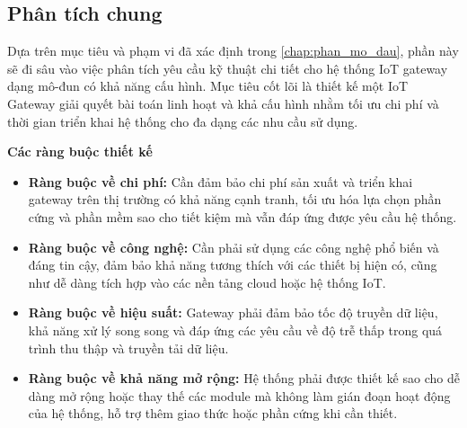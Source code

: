 \subsection{Phân tích chung}\label{sec:phan_tich_chung}
    Dựa trên mục tiêu và phạm vi đã xác định trong \autoref{chap:phan_mo_dau}, phần này sẽ đi sâu vào việc phân tích yêu cầu kỹ thuật chi tiết cho hệ thống IoT gateway dạng mô-đun có khả năng cấu hình. Mục tiêu cốt lõi là thiết kế một IoT Gateway giải quyết bài toán linh hoạt và khả cấu hình nhằm tối ưu chi phí và thời gian triển khai hệ thống cho đa dạng các nhu cầu sử dụng.

    \textbf{Các ràng buộc thiết kế}
        \begin{itemize}
            \item \textbf{Ràng buộc về chi phí:} Cần đảm bảo chi phí sản xuất và triển khai gateway trên thị trường có khả năng cạnh tranh, tối ưu hóa lựa chọn phần cứng và phần mềm sao cho tiết kiệm mà vẫn đáp ứng được yêu cầu hệ thống.
            \item \textbf{Ràng buộc về công nghệ:} Cần phải sử dụng các công nghệ phổ biến và đáng tin cậy, đảm bảo khả năng tương thích với các thiết bị hiện có, cũng như dễ dàng tích hợp vào các nền tảng cloud hoặc hệ thống IoT.
            \item \textbf{Ràng buộc về hiệu suất:} Gateway phải đảm bảo tốc độ truyền dữ liệu, khả năng xử lý song song và đáp ứng các yêu cầu về độ trễ thấp trong quá trình thu thập và truyền tải dữ liệu.
            \item \textbf{Ràng buộc về khả năng mở rộng:} Hệ thống phải được thiết kế sao cho dễ dàng mở rộng hoặc thay thế các module mà không làm gián đoạn hoạt động của hệ thống, hỗ trợ thêm giao thức hoặc phần cứng khi cần thiết.
        \end{itemize}